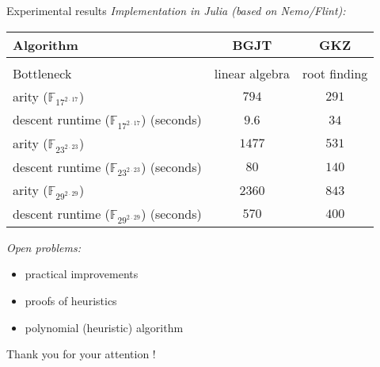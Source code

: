 \documentclass[xcolor=x11names,compress]{beamer}
\theoremstyle{break}
\theoremstyle{sc}
\theoremstyle{definition}
\theoremstyle{remark}
\begin{document}
\begin{frame}{Experimental results}
  \emph{Implementation in Julia (based on Nemo/Flint):}
\begin{center}
  \begin{tabular}[here]{lcc}
  Algorithm  & BGJT & GKZ \\
    \hline
    & & \\
    Bottleneck & linear algebra & root finding \\
    arity ($\mathbb{F}_{17^{2\cdot17}}$) & $794$ & $291$ \\
    descent runtime ($\mathbb{F}_{17^{2\cdot17}}$) (seconds) & $9.6$ & $34$ \\
    arity ($\mathbb{F}_{23^{2\cdot23}}$) & $1477$ & $531$ \\
    descent runtime ($\mathbb{F}_{23^{2\cdot23}}$) (seconds) & $80$ & $140$ \\
    arity ($\mathbb{F}_{29^{2\cdot29}}$) & $2360$ & $843$ \\
    descent runtime ($\mathbb{F}_{29^{2\cdot29}}$) (seconds) & $570$ & $400$ \\
  \end{tabular}
\end{center}

  \emph{Open problems:}
  \begin{itemize}
    \item practical improvements
    \item proofs of heuristics
    \item polynomial (heuristic) algorithm
  \end{itemize}

\end{frame}

\begin{frame}
  \begin{center}
   \huge{Thank you for your attention !}
  \end{center}
\end{frame}

\end{document}
